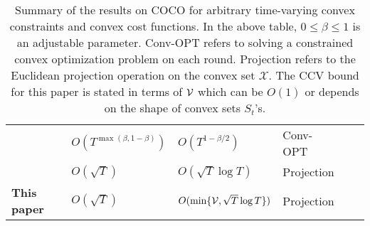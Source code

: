 \begin{table*}[t]
\begin{tabular}{llllll}
  \small {\citet{yi2023distributed}}  & \small {$O(T^{\max(\beta, 1-\beta)})$} & \small {$O(T^{1-\beta/2})$} & \small {Conv-OPT}  \\
     \small {\citet{Sinha2024}} & \small {$O(\sqrt{T})$} & \small {$O(\sqrt{T}\log T)$} & \small {Projection} \\
 \small {\textbf{This paper}} &   \small {$O(\sqrt{T})$} & \small {$O(\min\{\mathcal{V},\sqrt{T}\log T\})$} &\small {Projection}  \\
       \bottomrule
  \end{tabular}
  \vspace{5pt}
  \caption{\small{Summary of the results on COCO for arbitrary time-varying convex constraints and convex cost functions. In the above table, $0\leq \beta \leq 1$ is an adjustable parameter. Conv-OPT refers to solving a constrained convex optimization problem on each round. Projection refers to the Euclidean projection operation on the convex set $\mathcal{X}$. The CCV bound for this paper is stated in terms of $\mathcal{V}$ which can be $O(1)$ or depends on the shape of convex sets $S_t$'s. }}
    \label{gen-oco-review-table}
\end{table*}
